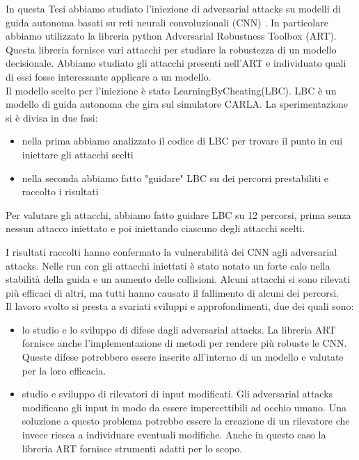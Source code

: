 In questa Tesi abbiamo studiato l'iniezione di adversarial attacks su modelli di guida autonoma basati su reti neurali convoluzionali (CNN) \cite{art2018}. In particolare
abbiamo utilizzato la libreria python Adversarial Robustness Toolbox (ART). Questa libreria fornisce vari attacchi per studiare la robustezza di un
modello decisionale. Abbiamo studiato gli attacchi presenti nell'ART  e individuato quali di essi fosse interessante applicare a un modello.\\

Il  modello  scelto per l'iniezione è stato LearningByCheating(LBC). LBC è un modello di guida autonoma che gira sul simulatore 
CARLA. La sperimentazione si è divisa in due fasi:\begin{itemize}
    \item nella prima abbiamo analizzato il codice di LBC per trovare il punto  in cui iniettare gli attacchi scelti
    \item nella seconda abbiamo fatto "guidare" LBC su dei percorsi prestabiliti e raccolto i risultati
\end{itemize} 

Per valutare gli attacchi, abbiamo fatto guidare LBC su 12 percorsi, prima senza nessun attacco iniettato e poi iniettando ciascuno degli attacchi scelti.

I risultati raccolti hanno confermato la vulnerabilità dei CNN agli adversarial attacks. Nelle run con gli attacchi iniettati è stato notato un forte calo nella stabilità della guida e un aumento delle collisioni.
Alcuni attacchi si sono rilevati più efficaci di altri, ma tutti hanno causato il fallimento di alcuni dei percorsi.\\

Il lavoro svolto si presta a svariati sviluppi e approfondimenti, due  dei quali sono:\begin{itemize}
    \item lo studio e lo sviluppo di difese dagli adversarial attacks. La libreria ART fornisce anche l'implementazione di metodi per rendere più robuste le CNN.
    Queste difese potrebbero essere inserite all'interno di un modello e valutate per la loro efficacia.
    \item studio e sviluppo di rilevatori di input modificati. Gli adversarial attacks modificano gli input in modo da essere impercettibili ad occhio umano. Una 
    soluzione a questo problema potrebbe essere la creazione di un rilevatore che invece riesca a individuare eventuali modifiche. Anche in questo caso
    la libreria ART  fornisce strumenti adatti per lo scopo.
\end{itemize}